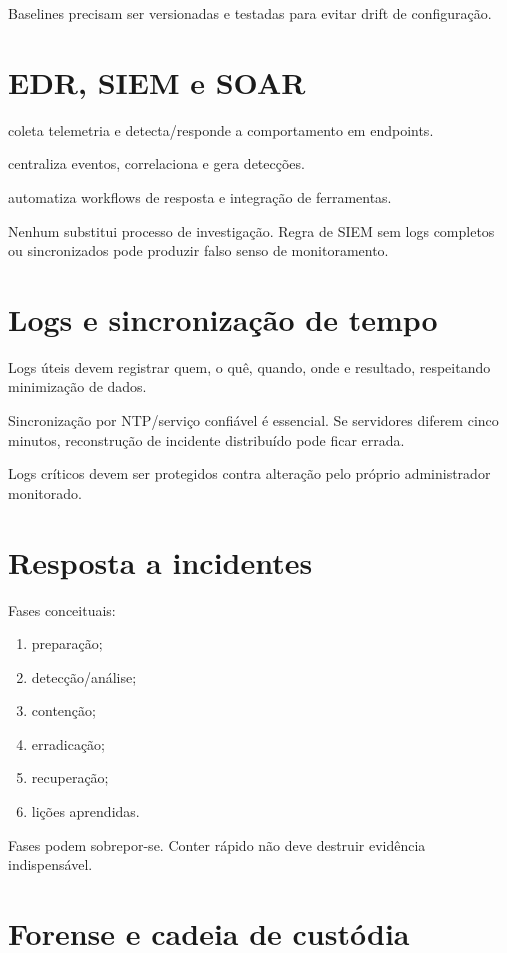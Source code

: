 Baselines precisam ser versionadas e testadas para evitar drift de configuração.

\section{EDR, SIEM e SOAR}

 coleta telemetria e detecta/responde a comportamento em endpoints.

 centraliza eventos, correlaciona e gera detecções.

 automatiza workflows de resposta e integração de ferramentas.

Nenhum substitui processo de investigação. Regra de SIEM sem logs completos ou sincronizados pode produzir falso senso de monitoramento.

\section{Logs e sincronização de tempo}

Logs úteis devem registrar quem, o quê, quando, onde e resultado, respeitando minimização de dados.

Sincronização por NTP/serviço confiável é essencial. Se servidores diferem cinco minutos, reconstrução de incidente distribuído pode ficar errada.

Logs críticos devem ser protegidos contra alteração pelo próprio administrador monitorado.

\section{Resposta a incidentes}

Fases conceituais:
\begin{enumerate}
\item preparação;
\item detecção/análise;
\item contenção;
\item erradicação;
\item recuperação;
\item lições aprendidas.
\end{enumerate}

Fases podem sobrepor-se. Conter rápido não deve destruir evidência indispensável.

\section{Forense e cadeia de custódia}


